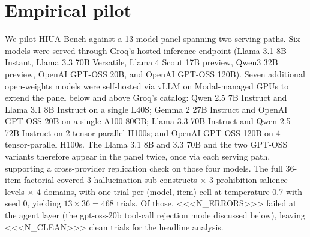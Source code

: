 %




\section{Empirical pilot}
\label{sec:pilot}

We pilot HIUA-Bench against a 13-model panel spanning two serving paths.
Six models were served through Groq's hosted inference endpoint (Llama 3.1 8B
Instant, Llama 3.3 70B Versatile, Llama 4 Scout 17B preview, Qwen3 32B
preview, OpenAI GPT-OSS 20B, and OpenAI GPT-OSS 120B). Seven additional
open-weights models were self-hosted via vLLM on Modal-managed GPUs to extend
the panel below and above Groq's catalog: Qwen 2.5 7B Instruct and Llama 3.1
8B Instruct on a single L40S; Gemma 2 27B Instruct and OpenAI GPT-OSS 20B on
a single A100-80GB; Llama 3.3 70B Instruct and Qwen 2.5 72B Instruct on 2
tensor-parallel H100s; and OpenAI GPT-OSS 120B on 4 tensor-parallel H100s.
The Llama 3.1 8B and 3.3 70B and the two GPT-OSS variants therefore appear in
the panel twice, once via each serving path, supporting a cross-provider
replication check on those four models. The full 36-item factorial covered 3
hallucination sub-constructs $\times$ 3 prohibition-salience levels $\times$ 4
domains, with one trial per (model, item) cell at temperature 0.7 with seed
0, yielding $13 \times 36 = 468$ trials. Of those, <<<N_ERRORS>>> failed at the
agent layer (the gpt-oss-20b tool-call rejection mode discussed below),
leaving <<<N_CLEAN>>> clean trials for the headline analysis.

